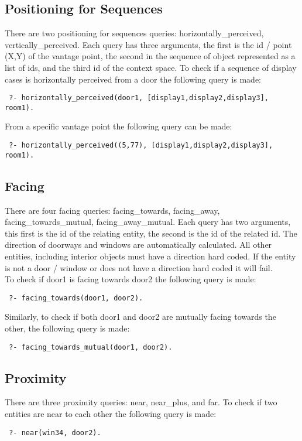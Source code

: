\documentclass[12pt]{article}
\begin{document}
\subsection{Positioning for Sequences}
There are two positioning for sequences queries: horizontally_perceived, vertically_perceived. Each query has three arguments, the first is the id / point (X,Y) of the vantage point, the second in the sequence of object represented as a list of ids, and the third id of the context space. To check if a sequence of display cases is horizontally perceived from a door the following query is made:
\begin{verbatim}
 ?- horizontally_perceived(door1, [display1,display2,display3], room1).
\end{verbatim} From a specific vantage point the following query can be made:
\begin{verbatim}
 ?- horizontally_perceived((5,77), [display1,display2,display3], room1).
\end{verbatim}


\subsection{Facing}
There are four facing queries: facing_towards, facing_away, facing_towards_mutual, facing_away_mutual. Each query has two arguments, this first is the id of the relating entity, the second is the id of the related id. The direction of doorways and windows are automatically calculated. All other entities, including interior objects must have a direction hard coded. If the entity is not a door / window or does not have a direction hard coded it will fail. \\

\noindent To check if door1 is facing towards door2 the following query is made:
\begin{verbatim}
 ?- facing_towards(door1, door2).
\end{verbatim} Similarly, to check if both door1 and door2 are mutually facing towards the other, the following query is made:
\begin{verbatim}
 ?- facing_towards_mutual(door1, door2).
\end{verbatim}

\subsection{Proximity}
There are three proximity queries: near, near_plus, and far. To check if two entities are near to each other the following query is made:
\begin{verbatim}
 ?- near(win34, door2).
\end{verbatim}
\end{document}
